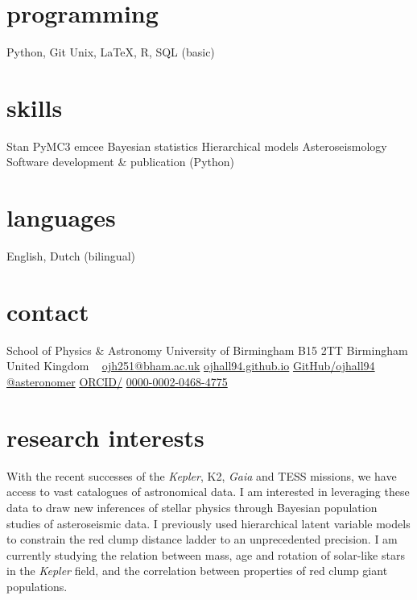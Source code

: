 \documentclass[]{k-cv} %
\begin{document}


\begin{aside} %
\section{programming}
\bodyfont Python, Git
Unix, LaTeX,
R, SQL (basic)
\section{skills}
Stan
PyMC3
emcee 
Bayesian statistics
Hierarchical models
Asteroseismology
Software development \& publication (Python)
\section{languages}
English, Dutch (bilingual)
\section{contact}
School of Physics \& Astronomy
University of Birmingham
B15 2TT
Birmingham
United Kingdom
~
\href{mailto:ojh251@student.bham.ac.uk}{ojh251@bham.ac.uk}
\href{http://www.ojhall94.github.io}{ojhall94.github.io}
\href{http://www.github.com/ojhall94}{GitHub/ojhall94}
\href{http://www.twitter.com/asteronomer}{@asteronomer}
\href{http://www.orcid.com/0000-0002-0468-4775}{ORCID/}
\href{http://www.orcid.com/0000-0002-0468-4775}{0000-0002-0468-4775}
\end{aside}

\section{research interests}
\bodyfont With the recent successes of the \textit{Kepler}, K2, \textit{Gaia} and TESS missions, we have access to vast catalogues of astronomical data. I am interested in leveraging these data to draw new inferences of stellar physics through Bayesian population studies of asteroseismic data. I previously used hierarchical latent variable models to constrain the red clump distance ladder to an unprecedented precision. I am currently studying the relation between mass, age and rotation of solar-like stars in the \textit{Kepler} field, and the correlation between properties of red clump giant populations.
\end{document}
